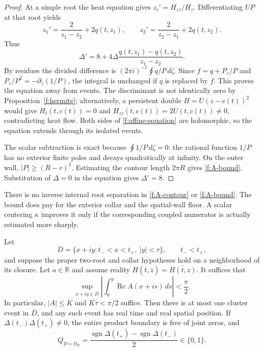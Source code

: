 \begin{proof}
At a simple root the heat equation gives $z_i'=H_{zz}/H_z$.
Differentiating $UP$ at that root yields
\[
 z_1'=\frac2{z_1-z_2}+2q(t,z_1),\qquad
 z_2'=\frac2{z_2-z_1}+2q(t,z_2).
\]
Thus
\[
 \Delta'=8+4\Delta\frac{q(t,z_1)-q(t,z_2)}{z_1-z_2}.
\]
By residues the divided difference is
$(2\pi i)^{-1}\oint q/P\,d\zeta$.  Since $f=q+P_z/P$ and
$P_z/P^2=-\partial_z(1/P)$, the integral is unchanged if $q$ is
replaced by $f$.  This proves the equation away from events.
The discriminant is not identically zero by
Proposition~\ref{f:hermite}; alternatively, a persistent double
$H=U(z-c(t))^2$ would give $H_t(t,c(t))=0$ and
$H_{zz}(t,c(t))=2U(t,c(t))\ne0$, contradicting heat flow.
Both sides of \eqref{f:affine-equation} are holomorphic, so the equation
extends through its isolated events.

The scalar subtraction is exact because $\oint1/P\,d\zeta=0$:
the rational function $1/P$ has no exterior finite poles and decays
quadratically at infinity.  On the outer wall,
$|P|\ge(R-r)^2$.  Estimating the contour length $2\pi R$ gives
\eqref{f:A-bound}.  Substitution of $\Delta=0$ in the equation gives
$\Delta'=8$.
\end{proof}

There is no inverse internal root separation in
\eqref{f:A-contour} or \eqref{f:A-bound}.  The bound does pay for
the exterior collar and the spatial-wall floor.  A scalar centering
$\kappa$ improves it only if the corresponding coupled numerator is
actually estimated more sharply.

\begin{theorem}
\label{f:real-cap}
Let
\[
 D=\{x+iy:t_-<x<t_+,\ |y|<\tau\},\qquad t_-<t_+,
\]
and suppose the proper two-root and collar hypotheses hold on a
neighborhood of its closure.  Let $a\in\mathbb R$ and assume reality
$H(\overline t,\overline z)=\overline{H(t,z)}$.  It suffices that
\begin{equation}\label{f:phase}
 \sup_{x+iy\in\overline D}
   \left|\int_0^y\operatorname{Re} A(x+is)\,ds\right|<\frac\pi2.
\end{equation}
In particular, $|A|\le K$ and $K\tau<\pi/2$ suffice.  Then there
is at most one cluster event in $\overline D$, and any such event has
real time and real spatial position.  If
$\Delta(t_-)\Delta(t_+)\ne0$, the entire product boundary is free
of joint zeros, and
\begin{equation}\label{f:cap-charge}
 Q_{D\times\Omega_R}
  =\frac{\operatorname{sgn}\Delta(t_+)
               -\operatorname{sgn}\Delta(t_-)}2\in\{0,1\}.
\end{equation}
\end{theorem}

